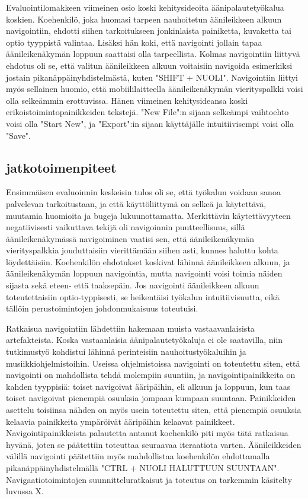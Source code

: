 \documentclass[utf8]{gradu3}
\begin{document}
Evaluointilomakkeen viimeinen osio koski kehitysideoita äänipalautetyökalua koskien. Koehenkilö, joka huomasi tarpeen nauhoitetun äänileikkeen alkuun navigointiin, ehdotti siihen tarkoitukseen jonkinlaista painiketta, kuvaketta tai optio tyyppistä valintaa. Lisäksi hän koki, että navigointi jollain tapaa äänileikenäkymän loppuun saattaisi olla tarpeellista. Kolmas navigointiin liittyvä ehdotus oli se, että valitun äänileikkeen alkuun voitaisiin navigoida esimerkiksi jostain pikanäppäinyhdistelmästä, kuten "SHIFT + NUOLI". Navigointiin liittyi myös sellainen huomio, että mobiililaitteella äänileikenäkymän vierityspalkki voisi olla selkeämmin erottuvissa. Hänen viimeinen kehitysideansa koski erikoistoimintopainikkeiden tekstejä. "New File":n sijaan selkeämpi vaihtoehto voisi olla "Start New", ja "Export":in sijaan käyttäjälle intuitiivisempi voisi olla "Save".

\subsection{jatkotoimenpiteet}

Ensimmäisen evaluoinnin keskeisin tulos oli se, että työkalun voidaan sanoa palvelevan tarkoitustaan, ja että käyttöliittymä on selkeä ja käytettävä, muutamia huomioita ja bugeja lukuunottamatta. Merkittävin käytettävyyteen negatiivisesti vaikuttava tekijä oli navigoinnin puutteellisuus, sillä äänileikenäkymässä navigoiminen vaatisi sen, että äänileikenäkymän vierityspalkkia jouduttaisiin vierittämään siihen asti, kunnes haluttu kohta löydettäisiin. Koehenkilön ehdotukset koskivat lähinnä äänileikkeen alkuun, ja äänileikenäkymän loppuun navigointia, mutta navigointi voisi toimia näiden sijasta sekä eteen- että taaksepäin. Jos navigointi äänileikkeen alkuun toteutettaisiin optio-typpisesti, se heikentäisi työkalun intuitiivisuutta, eikä tällöin perustoimintojen johdonmukaisuus toteutuisi.

Ratkaisua navigointiin lähdettiin hakemaan muista vastaavanlaisista artefakteista. Koska vastaanlaisia äänipalautetyökaluja ei ole saatavilla, niin tutkimustyö kohdistui lähinnä perinteisiin nauhoitustyökaluihin ja musiikkiohjelmistoihin. Useissa ohjelmistoissa navigointi  on toteutettu siten, että navigointi on mahdollista tehdä molempiin suuntiin, ja navigointipainikkeita on kahden tyyppisiä: toiset navigoivat ääripäihin, eli alkuun ja loppuun, kun taas toiset navigoivat pienempiä osuuksia jompaan kumpaan suuntaan. Painikkeiden asettelu toisiinsa nähden on myös usein toteutettu siten, että pienempiä osuuksia kelaavia painikkeita ympäröivät ääripäihin kelaavat painikkeet. Navigointipainikkeista palautetta antanut koehenkilö piti myös tätä ratkaisua hyvänä, joten se päätettiin toteuttaa seuraavaa iteraatiota varten. Äänileikkeiden välillä navigointi päätettiin myös mahdollistaa koehenkilön ehdottamalla pikanäppäinyhdistelmällä "CTRL + NUOLI HALUTTUUN SUUNTAAN". Navigaatiotoimintojen suunnitteluratkaisut ja toteutus on tarkemmin käsitelty luvussa X.
\end{document}
